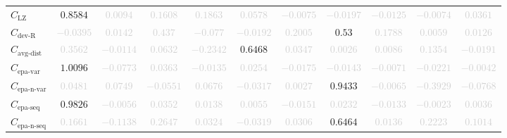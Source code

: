 \documentclass{standalone}
\newcommand{\lempelzivname}{\text{LZ}}
\newcommand{\lempelziv}{C_{\lempelzivname}}
\newcommand{\deviationfromrandomname}{\text{dev-R}}
\newcommand{\deviationfromrandom}{C_{\deviationfromrandomname}}
\newcommand{\avgdistname}{\text{avg-dist}}
\newcommand{\avgdist}{C_{\avgdistname}}
\newcommand{\epavariantname}{\text{epa-var}}
\newcommand{\epavariant}{C_{\epavariantname}}
\newcommand{\epanormvariantname}{\text{epa-n-var}}
\newcommand{\epanormvariant}{C_{\epanormvariantname}}
\newcommand{\epasequencename}{\text{epa-seq}}
\newcommand{\epasequence}{C_{\epasequencename}}
\newcommand{\epanormsequencename}{\text{epa-n-seq}}
\newcommand{\epanormsequence}{C_{\epanormsequencename}}
\begin{document}
\begin{tabular}{lcccccccccc}
$\lempelziv$ & $0.8584$ & \textcolor{lightgray}{$0.0094$} & \textcolor{lightgray}{$0.1608$} & \textcolor{lightgray}{$0.1863$} & \textcolor{lightgray}{$0.0578$} & \textcolor{lightgray}{$-0.0075$} & \textcolor{lightgray}{$-0.0197$} & \textcolor{lightgray}{$-0.0125$} & \textcolor{lightgray}{$-0.0074$} & \textcolor{lightgray}{$0.0361$} \\ 
$\deviationfromrandom$ & \textcolor{lightgray}{$-0.0395$} & \textcolor{lightgray}{$0.0142$} & \textcolor{lightgray}{$0.437$} & \textcolor{lightgray}{$-0.077$} & \textcolor{lightgray}{$-0.0192$} & \textcolor{lightgray}{$0.2005$} & $0.53$ & \textcolor{lightgray}{$0.1788$} & \textcolor{lightgray}{$0.0059$} & \textcolor{lightgray}{$0.0126$} \\ 
$\avgdist$ & \textcolor{lightgray}{$0.3562$} & \textcolor{lightgray}{$-0.0114$} & \textcolor{lightgray}{$0.0632$} & \textcolor{lightgray}{$-0.2342$} & $0.6468$ & \textcolor{lightgray}{$0.0347$} & \textcolor{lightgray}{$0.0026$} & \textcolor{lightgray}{$0.0086$} & \textcolor{lightgray}{$0.1354$} & \textcolor{lightgray}{$-0.0191$} \\ 
$\epavariant$ & $1.0096$ & \textcolor{lightgray}{$-0.0773$} & \textcolor{lightgray}{$0.0363$} & \textcolor{lightgray}{$-0.0135$} & \textcolor{lightgray}{$0.0254$} & \textcolor{lightgray}{$-0.0175$} & \textcolor{lightgray}{$-0.0143$} & \textcolor{lightgray}{$-0.0071$} & \textcolor{lightgray}{$-0.0221$} & \textcolor{lightgray}{$-0.0042$} \\ 
$\epanormvariant$ & \textcolor{lightgray}{$0.0481$} & \textcolor{lightgray}{$0.0749$} & \textcolor{lightgray}{$-0.0551$} & \textcolor{lightgray}{$0.0676$} & \textcolor{lightgray}{$-0.0317$} & \textcolor{lightgray}{$0.0027$} & $0.9433$ & \textcolor{lightgray}{$-0.0065$} & \textcolor{lightgray}{$-0.3929$} & \textcolor{lightgray}{$-0.0768$} \\ 
$\epasequence$ & $0.9826$ & \textcolor{lightgray}{$-0.0056$} & \textcolor{lightgray}{$0.0352$} & \textcolor{lightgray}{$0.0138$} & \textcolor{lightgray}{$0.0055$} & \textcolor{lightgray}{$-0.0151$} & \textcolor{lightgray}{$0.0232$} & \textcolor{lightgray}{$-0.0133$} & \textcolor{lightgray}{$-0.0023$} & \textcolor{lightgray}{$0.0036$} \\ 
$\epanormsequence$ & \textcolor{lightgray}{$0.1661$} & \textcolor{lightgray}{$-0.1138$} & \textcolor{lightgray}{$0.2647$} & \textcolor{lightgray}{$0.0324$} & \textcolor{lightgray}{$-0.0319$} & \textcolor{lightgray}{$0.0306$} & $0.6464$ & \textcolor{lightgray}{$0.0136$} & \textcolor{lightgray}{$0.2223$} & \textcolor{lightgray}{$0.1014$} \\ 

\end{tabular}
\end{document}
